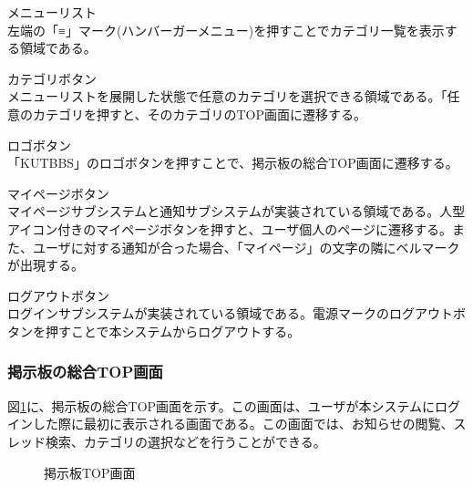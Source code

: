 \documentclass[a4j]{jarticle}
\begin{document}
  \item メニューリスト\\
  左端の「≡」マーク(ハンバーガーメニュー)を押すことでカテゴリ一覧を表示する領域である。
  \item カテゴリボタン\\
  メニューリストを展開した状態で任意のカテゴリを選択できる領域である。「任意のカテゴリを押すと、そのカテゴリのTOP画面に遷移する。
  \item ロゴボタン\\
  「KUTBBS」のロゴボタンを押すことで、掲示板の総合TOP画面に遷移する。
  \item マイページボタン\\
  マイページサブシステムと通知サブシステムが実装されている領域である。人型アイコン付きのマイページボタンを押すと、ユーザ個人のページに遷移する。また、ユーザに対する通知が合った場合、「マイページ」の文字の隣にベルマークが出現する。
  \item ログアウトボタン\\
  ログインサブシステムが実装されている領域である。電源マークのログアウトボタンを押すことで本システムからログアウトする。



\subsubsection{掲示板の総合TOP画面}
図\ref{fig:BBS_top}に、掲示板の総合TOP画面を示す。この画面は、ユーザが本システムにログインした際に最初に表示される画面である。この画面では、お知らせの閲覧、スレッド検索、カテゴリの選択などを行うことができる。

\begin{figure}[H]
\centering
{}
\caption{掲示板TOP画面}
\label{fig:BBS_top}
\end{figure}
\end{document}

